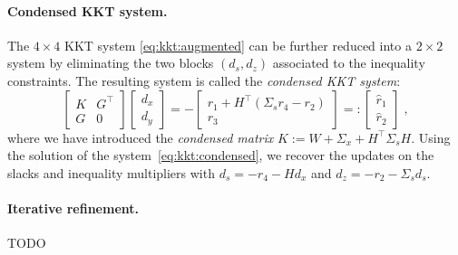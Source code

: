 \paragraph{Condensed KKT system.}
The $4 \times 4$ KKT system \eqref{eq:kkt:augmented} can be further
reduced into a $2 \times 2$ system by eliminating the two blocks
$(d_s, d_z)$ associated to the inequality constraints.
The resulting system is called the \emph{condensed KKT system}:
\begin{equation}
  \label{eq:kkt:condensed}
  \tag{$K_1$}
  \begin{bmatrix}
    K & G^\top \\
    G & 0
  \end{bmatrix}
  \begin{bmatrix}
    d_x \\ d_y
  \end{bmatrix}
  =
  -
  \begin{bmatrix}
    r_1 + H^\top(\Sigma_s r_4 - r_2) \\ r_3
  \end{bmatrix}
  =:
  \begin{bmatrix}
    \hat{r}_1 \\ \hat{r}_2
  \end{bmatrix}
   \; ,
\end{equation}
where we have introduced the \emph{condensed matrix} $K := W + \Sigma_x + H^\top \Sigma_s H$.
Using the solution of the system~\eqref{eq:kkt:condensed},
we recover the updates on the slacks and inequality multipliers with
$d_s = -r_4 - Hd_x$ and $d_z = -r_2 - \Sigma_s d_s$.

\paragraph{Iterative refinement.} TODO

